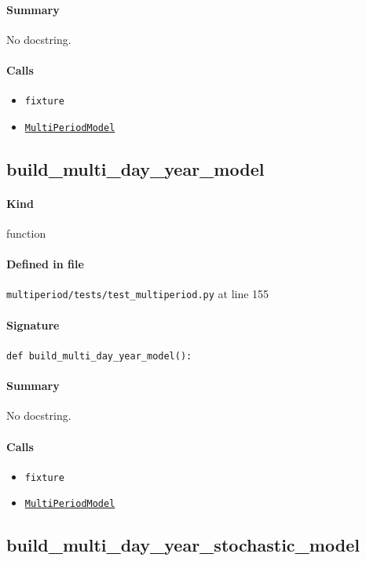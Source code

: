 \documentclass[11pt]{report}
\begin{document}
\paragraph{Summary} No docstring.
\paragraph{Calls}
\begin{itemize}[leftmargin=*]
  \item \texttt{fixture}
  \item \hyperref[def:multiperiod-multiperiod.py:MultiPeriodModel:L24]{\texttt{MultiPeriodModel}}
\end{itemize}
\subsection{build\_multi\_day\_year\_model}
\label{def:multiperiod-tests-test_multiperiod.py:build_multi_day_year_model:L155}
\paragraph{Kind} function
\paragraph{Defined in file} \texttt{multiperiod/tests/test\_multiperiod.py} at line 155
\paragraph{Signature} \texttt{def build\_multi\_day\_year\_model():}
\paragraph{Summary} No docstring.
\paragraph{Calls}
\begin{itemize}[leftmargin=*]
  \item \texttt{fixture}
  \item \hyperref[def:multiperiod-multiperiod.py:MultiPeriodModel:L24]{\texttt{MultiPeriodModel}}
\end{itemize}
\subsection{build\_multi\_day\_year\_stochastic\_model}
\label{def:multiperiod-tests-test_multiperiod.py:build_multi_day_year_stochastic_model:L171}
\end{document}

